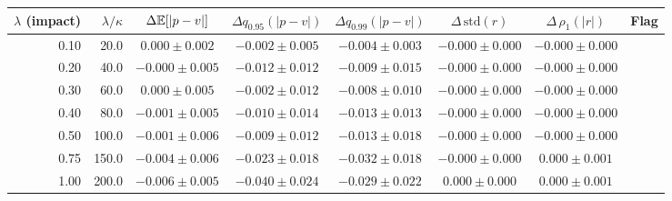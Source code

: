 \begin{tabular}{rrcccccc}
\hline
$\lambda$ (impact) & $\lambda/\kappa$ & $\Delta\mathbb{E}[|p-v|]$ & $\Delta q_{0.95}(|p-v|)$ & $\Delta q_{0.99}(|p-v|)$ & $\Delta\,\mathrm{std}(r)$ & $\Delta\,\rho_1(|r|)$ & Flag \\
\hline
0.10 & 20.0 & $0.000\pm0.002$ & $-0.002\pm0.005$ & $-0.004\pm0.003$ & $-0.000\pm0.000$ & $-0.000\pm0.000$ &  \\
0.20 & 40.0 & $-0.000\pm0.005$ & $-0.012\pm0.012$ & $-0.009\pm0.015$ & $-0.000\pm0.000$ & $-0.000\pm0.000$ &  \\
0.30 & 60.0 & $0.000\pm0.005$ & $-0.002\pm0.012$ & $-0.008\pm0.010$ & $-0.000\pm0.000$ & $-0.000\pm0.000$ &  \\
0.40 & 80.0 & $-0.001\pm0.005$ & $-0.010\pm0.014$ & $-0.013\pm0.013$ & $-0.000\pm0.000$ & $-0.000\pm0.000$ &  \\
0.50 & 100.0 & $-0.001\pm0.006$ & $-0.009\pm0.012$ & $-0.013\pm0.018$ & $-0.000\pm0.000$ & $-0.000\pm0.000$ &  \\
0.75 & 150.0 & $-0.004\pm0.006$ & $-0.023\pm0.018$ & $-0.032\pm0.018$ & $-0.000\pm0.000$ & $0.000\pm0.001$ &  \\
1.00 & 200.0 & $-0.006\pm0.005$ & $-0.040\pm0.024$ & $-0.029\pm0.022$ & $0.000\pm0.000$ & $0.000\pm0.001$ &  \\
\hline
\end{tabular}
